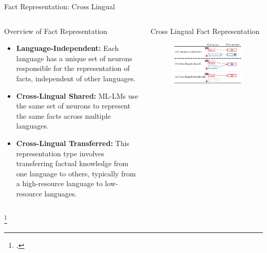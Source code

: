 \documentclass{beamer}
\begin{document}
	\begin{frame}{Fact Representation: Cross Lingual}
		\begin{columns}
			\begin{block}{\scriptsize Overview of Fact Representation}\scriptsize
				\begin{itemize}
					\item \textbf{Language-Independent:} Each language has a unique set of neurons responsible for the representation of facts, independent of other languages.
					
					\item \textbf{Cross-Lingual Shared:} ML-LMs use the same set of neurons to represent the same facts across multiple languages. 
					
					\item \textbf{Cross-Lingual Transferred:} This representation type involves transferring factual knowledge from one language to others, typically from a high-resource language to low-resource languages.
				\end{itemize}
			\end{block}
			\begin{block}{\scriptsize Cross Lingual Fact Representation\footnotemark}
				\begin{figure}
					\centering
					\includegraphics[width=\textwidth]{fact}
				\end{figure}
			\end{block}
		\end{columns}\footcitetext{zhao2024tracing}
	\end{frame}
	
\end{document}

